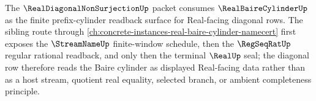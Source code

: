 The $\RealDiagonalNonSurjectionUp$ packet consumes $\RealBaireCylinderUp$ as the finite prefix-cylinder readback surface for Real-facing diagonal rows. The sibling route through \autoref{ch:concrete-instances-real-baire-cylinder-namecert} first exposes the $\StreamNameUp$ finite-window schedule, then the $\RegSeqRatUp$ regular rational readback, and only then the terminal $\RealUp$ seal; the diagonal row therefore reads the Baire cylinder as displayed Real-facing data rather than as a host stream, quotient real equality, selected branch, or ambient completeness principle.
